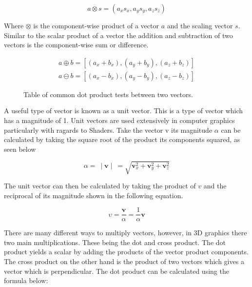 \begin{equation}
a \otimes s = (a_x s_x, a_y s_y, a_z s_z)
\end{equation}

\noindent
Where $\otimes$ is the component-wise product of a vector $a$ and the scaling vector $s$. Similar to the scalar product of a vector the addition and subtraction of two vectors is the component-wise sum or difference. 

\begin{equation}
\begin{aligned}
a \oplus b = [(a_x + b_x), (a_y + b_y), (a_z + b_z)]\\
a \ominus b = [(a_x - b_x), (a_y - b_y), (a_z - b_z)]
\end{aligned}
\end{equation}

\begin{figure}[htbp]
	{\centering
		\setlength{\fboxrule}{1pt}
		\vspace{7px}
		\caption{Table of common dot product tests between two vectors.}
	}
\end{figure}
\FloatBarrier

\noindent
A useful type of vector is known as a unit vector. This is a type of vector which has a magnitude of 1. Unit vectors are used extensively in computer graphics particularly with ragards to \gls{Shader}s. Take the vector v its magnitude $\alpha$ can be calculated by taking the square root of the product its components squared, as seen below 

\begin{equation}
	\alpha =~ \mid \textbf{v} \mid~ = \sqrt{\textbf{v}^2_x + \textbf{v}^2_y + \textbf{v}^2_z}
\end{equation}

The unit vector can then be calculated by taking the product of $v$ and the reciprocal of its magnitude shown in the following equation.

\begin{equation}
	\upsilon = \frac{\textbf{v}}{\alpha} = \frac{1}{\alpha} \textbf{v}
\end{equation}

There are many different ways to multiply vectors, however, in 3D graphics there two main multiplications. These being the dot and cross product. The dot product yields a scalar by adding the products of the vector product components. The cross product on the other hand is the product of two vectors which gives a vector which is perpendicular. The dot product can be calculated using the formula below: 

